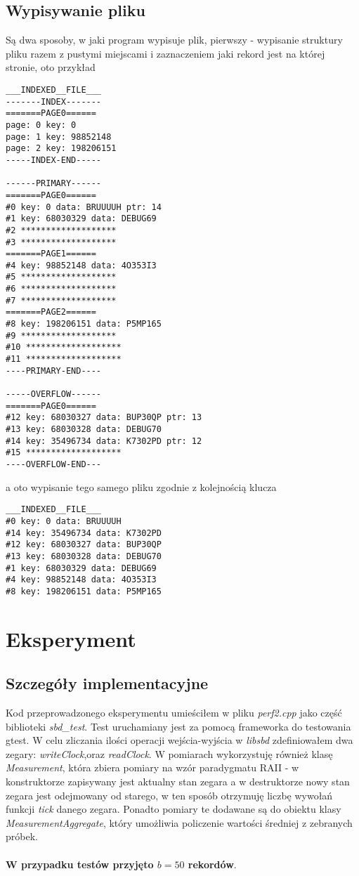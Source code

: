 \documentclass{article}
\begin{document}
\subsection{Wypisywanie pliku}
Są dwa sposoby, w jaki program wypisuje plik, pierwszy - wypisanie struktury pliku razem z pustymi miejscami i zaznaczeniem jaki rekord jest na której stronie, oto przykład
\begin{lstlisting}
___INDEXED__FILE___
-------INDEX-------
=======PAGE0======
page: 0 key: 0
page: 1 key: 98852148
page: 2 key: 198206151
-----INDEX-END-----

------PRIMARY------
=======PAGE0======
#0 key: 0 data: BRUUUUH ptr: 14
#1 key: 68030329 data: DEBUG69
#2 *******************
#3 *******************
=======PAGE1======
#4 key: 98852148 data: 4O353I3
#5 *******************
#6 *******************
#7 *******************
=======PAGE2======
#8 key: 198206151 data: P5MP165
#9 *******************
#10 *******************
#11 *******************
----PRIMARY-END----

-----OVERFLOW------
=======PAGE0======
#12 key: 68030327 data: BUP30QP ptr: 13
#13 key: 68030328 data: DEBUG70
#14 key: 35496734 data: K7302PD ptr: 12
#15 *******************
----OVERFLOW-END---
\end{lstlisting}
a oto wypisanie tego samego pliku zgodnie z kolejnością klucza
\begin{lstlisting}
___INDEXED__FILE___
#0 key: 0 data: BRUUUUH
#14 key: 35496734 data: K7302PD
#12 key: 68030327 data: BUP30QP
#13 key: 68030328 data: DEBUG70
#1 key: 68030329 data: DEBUG69
#4 key: 98852148 data: 4O353I3
#8 key: 198206151 data: P5MP165
\end{lstlisting}

\section{Eksperyment}
\subsection{Szczegóły implementacyjne}
Kod przeprowadzonego eksperymentu umieściłem w pliku \textit{perf2.cpp} jako część biblioteki \textit{sbd\_test}. Test uruchamiany jest za pomocą frameworka do
testowania gtest. W celu zliczania ilości operacji wejścia-wyjścia w \textit{libsbd} zdefiniowałem dwa zegary: 
\textit{writeClock},oraz \textit{readClock}. W pomiarach wykorzystuję również klasę \textit{Measurement}, która zbiera pomiary na wzór paradygmatu RAII - w 
konstruktorze zapisywany jest aktualny stan zegara a w destruktorze nowy stan zegara jest odejmowany od starego, w ten sposób otrzymuję liczbę
wywołań funkcji \textit{tick} danego zegara. Ponadto pomiary te dodawane są do obiektu klasy \textit{MeasurementAggregate}, który umożliwia policzenie wartości średniej z zebranych próbek. \\\\
\textbf{W przypadku testów przyjęto $b=50$ rekordów}.
\end{document}
